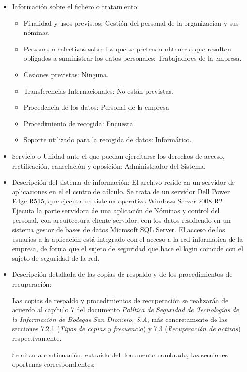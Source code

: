 \documentclass[a4paper,11pt,bibtotoc,noliststotoc]{scrbook}
\begin{document}
\begin{itemize}
\item Información sobre el fichero o tratamiento:
	\begin{itemize}
	\item Finalidad y usos previstos: Gestión del personal de la organización y sus nóminas.
	\item Personas o colectivos sobre los que se pretenda obtener o que resulten obligados a suministrar los datos personales: Trabajadores de la empresa.
	\item Cesiones previstas: Ninguna.
	\item Transferencias Internacionales: No están previstas.
	\item Procedencia de los datos: Personal de la empresa.
	\item Procedimiento de recogida: Encuesta.
	\item Soporte utilizado para la recogida de datos: Informático.
	\end{itemize}

\item Servicio o Unidad ante el que puedan ejercitarse los derechos de acceso, rectificación, cancelación y oposición: Administrador del Sistema.

\item Descripción del sistema de información: El archivo reside en un servidor de aplicaciones en el el centro de cálculo. Se trata de un servidor Dell Power Edge R515, que ejecuta un sistema operativo Windows Server 2008 R2. Ejecuta la parte servidora de una aplicación de Nóminas y control del personal, con arquitectura cliente-servidor, con los datos residiendo en un sistema gestor de bases de datos Microsoft SQL Server. El acceso de los usuarios a la aplicación está integrado con el acceso a la red informática de la empresa, de forma que el sujeto de seguridad que hace el login coincide con el sujeto de seguridad de la red.

\item Descripción detallada de las copias de respaldo y de los procedimientos de recuperación:

Las copias de respaldo y procedimientos de recuperación se realizarán de acuerdo al capítulo 7 del documento \emph{Política de Seguridad de Tecnologías de la Información de Bodegas San Dionisio, S.A}, más concretamente de las secciones 7.2.1 (\emph{Tipos de copias y frecuencia}) y 7.3 (\emph{Recuperación de activos}) respectivamente. 

Se citan a continuación, extraido del documento nombrado, las secciones oportunas correspondientes:


\end{itemize}
\end{document}
